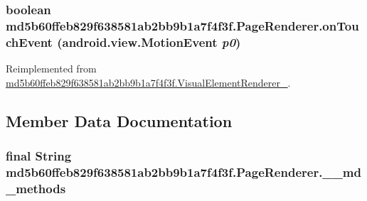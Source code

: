 \hypertarget{classmd5b60ffeb829f638581ab2bb9b1a7f4f3f_1_1_page_renderer_83a5007f3a24de66ed291c422b3b2adf}{
\subsubsection[{onTouchEvent}]{\setlength{\rightskip}{0pt plus 5cm}boolean md5b60ffeb829f638581ab2bb9b1a7f4f3f.PageRenderer.onTouchEvent (android.view.MotionEvent {\em p0})}}
\label{classmd5b60ffeb829f638581ab2bb9b1a7f4f3f_1_1_page_renderer_83a5007f3a24de66ed291c422b3b2adf}




Reimplemented from \hyperlink{classmd5b60ffeb829f638581ab2bb9b1a7f4f3f_1_1_visual_element_renderer__1_3beb6d0ebf9e1eca68fed2eac13c88ac}{md5b60ffeb829f638581ab2bb9b1a7f4f3f.VisualElementRenderer\_}.

\subsection{Member Data Documentation}
\hypertarget{classmd5b60ffeb829f638581ab2bb9b1a7f4f3f_1_1_page_renderer_ae4f94a2ae5f7a20817732bf98264a0a}{
\subsubsection[{\_\-\_\-md\_\-methods}]{\setlength{\rightskip}{0pt plus 5cm}final String {\bf md5b60ffeb829f638581ab2bb9b1a7f4f3f.PageRenderer.\_\-\_\-md\_\-methods}}}
\label{classmd5b60ffeb829f638581ab2bb9b1a7f4f3f_1_1_page_renderer_ae4f94a2ae5f7a20817732bf98264a0a}




